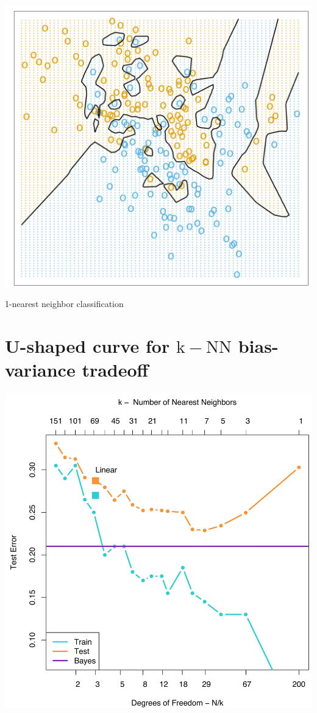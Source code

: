 \documentclass[10pt]{article}
\begin{document}
\begin{center}
\includegraphics[max width=\textwidth]{2023_12_30_f937b0007b5d87b39f79g-22}
\end{center}

1-nearest neighbor classification

\section*{U-shaped curve for $\mathrm{k}-\mathrm{NN}$ bias-variance tradeoff}
\begin{center}
\includegraphics[max width=\textwidth]{2023_12_30_f937b0007b5d87b39f79g-23}
\end{center}
\end{document}
